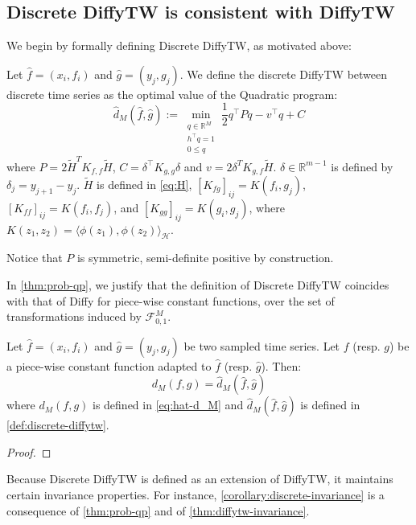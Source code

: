 \subsection{Discrete DiffyTW is consistent with DiffyTW}\label{sec:consistent}
We begin by formally defining Discrete DiffyTW, as motivated above:
\begin{definition}\label{def:discrete-diffytw} Let $\hat f = (x_i, f_i)$ and $\hat g= (y_j, g_j)$. We define the discrete DiffyTW between discrete time series as the optimal value of the Quadratic program:
\begin{equation}\label{prob:qp}
    \hat d_M(\hat f, \hat g) :=\min_{\substack{q\in\mathbb R^{M}\\h^\top q=1\\0 \leq q}}\frac{1}{2}q^\top Pq - v^\top q + C
\end{equation}
where $P= 2\tilde H^TK_{f, f}\tilde H$, $C= \delta^\top K_{g,g}\delta$ and $v= 2 \delta^TK_{g,f}\tilde H$. $\delta\in\mathbb R^{m-1}$ is defined by $\delta_j = y_{j+1} - y_j$. $\tilde H$ is defined in \cref{eq:H}, $[K_{fg}]_{ij} = K(f_i, g_j)$, $[K_{ff}]_{ij} = K(f_i, f_j)$, and $[K_{gg}]_{ij} = K(g_i, g_j)$, where $K(z_1, z_2) = \langle \phi(z_1), \phi(z_2)\rangle_\mathcal H$.
\end{definition}
Notice that $P$ is symmetric, semi-definite positive by construction.

In \cref{thm:prob-qp}, we justify that the definition of Discrete DiffyTW coincides with that of Diffy for piece-wise constant functions, over the set of transformations induced by $\mathcal F_{0, 1}^M$.
\begin{theorem}\label{thm:prob-qp}
Let $\hat f = (x_i, f_i)$ and $\hat g = (y_j, g_j)$ be two sampled time series. Let $f$ (resp. $g$) be a piece-wise constant function adapted to $\hat f$ (resp. $\hat g$). Then:
\begin{equation}
d_M(f, g) = \hat d_M(\hat f, \hat g)
\end{equation}
where $d_M(f, g)$ is defined in \cref{eq:hat-d_M} and $\hat d_M(\hat f, \hat g)$ is defined in \cref{def:discrete-diffytw}.
\end{theorem}

\begin{proof}
\end{proof}

Because Discrete DiffyTW is defined as an extension of DiffyTW, it maintains certain invariance properties. For instance, \cref{corollary:discrete-invariance} is a consequence of \cref{thm:prob-qp} and of \cref{thm:diffytw-invariance}.

